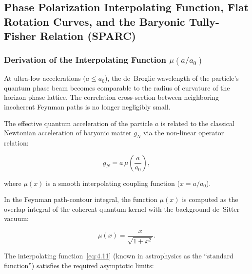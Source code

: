 \subsection{Phase Polarization Interpolating Function, Flat Rotation Curves, and the Baryonic Tully-Fisher Relation (SPARC)}\label{sec:4.2}

\subsubsection{Derivation of the Interpolating Function $\mu(a/a_0)$}\label{sec:4.2.1}

At ultra-low accelerations ($a \le a_0$), the de~Broglie wavelength of the particle's quantum phase beam becomes comparable to the radius of curvature of the horizon phase lattice. The correlation cross-section between neighboring incoherent Feynman paths is no longer negligibly small.

The effective quantum acceleration of the particle $a$ is related to the classical Newtonian acceleration of baryonic matter $g_N$ via the non-linear operator relation:

\begin{equation}\label{eq:4.10}\tag{4.10}
g_N = a \, \mu\left( \frac{a}{a_0} \right),
\end{equation}

where $\mu(x)$ is a smooth interpolating coupling function ($x = a/a_0$).

In the Feynman path-contour integral, the function $\mu(x)$ is computed as the overlap integral of the coherent quantum kernel with the background de~Sitter vacuum:

\begin{equation}\label{eq:4.11}\tag{4.11}
\mu(x) = \frac{x}{\sqrt{1 + x^2}}.
\end{equation}

The interpolating function~\eqref{eq:4.11} (known in astrophysics as the ``standard function'') satisfies the required asymptotic limits:

